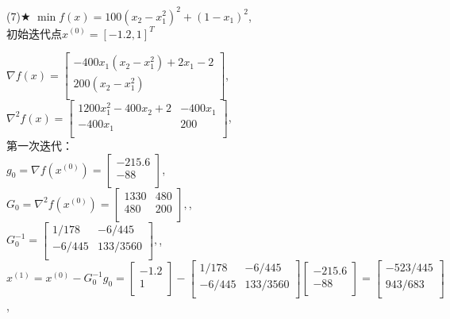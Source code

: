 \begin{problem}{(7)$\bigstar$}
    $\min f(x)=100(x_2-x_1^2)^2+(1-x_1)^2$,\\
    初始迭代点${x^{(0)}}=[-1.2,1]^T$
\end{problem}
\begin{solution}
    $\nabla f(x)=\begin{bmatrix}
        -400x_1(x_2-x_1^2)+2x_1-2  \\
        200(x_2-x_1^2)  \\
    \end{bmatrix}$, \\
    $\nabla^2 f(x)=\begin{bmatrix}
        1200x_1^2-400x_2+2 & -400x_1  \\
        -400x_1  & 200  \\
    \end{bmatrix}$,\\
    第一次迭代：\\
    $g_0=\nabla f(x^{(0)})=\begin{bmatrix} -215.6\\-88\\\end{bmatrix}$,\\
    $G_0=\nabla^2 f(x^{(0)})=\begin{bmatrix}
        1330 & 480\\
        480 & 200\\
    \end{bmatrix},$,\\
    $G_0^{-1}=\begin{bmatrix}
        1/178 & -6/445\\
        -6/445 & 133/3560\\
    \end{bmatrix},$,\\
    $x^{(1)}=x^{(0)}-G_0^{-1}g_0=\begin{bmatrix} -1.2\\1\\\end{bmatrix}-\begin{bmatrix}
        1/178 & -6/445\\
        -6/445 & 133/3560\\
    \end{bmatrix}\begin{bmatrix} -215.6\\-88\\\end{bmatrix}=\begin{bmatrix} -523/445\\943/683\\\end{bmatrix}$,\\

\end{solution}
